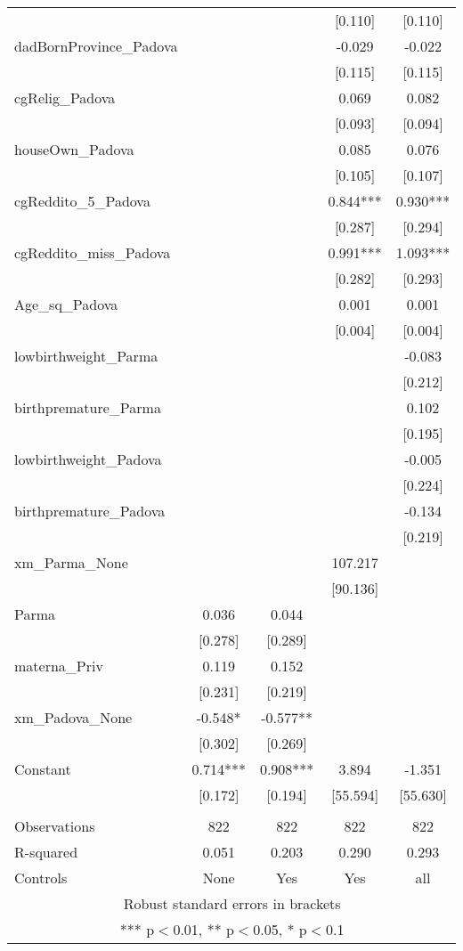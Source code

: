 \documentclass[]{article}
\begin{document}
\begin{tabular}{lcccc}
 &  &  & [0.110] & [0.110] \\
dadBornProvince\_Padova &  &  & -0.029 & -0.022 \\
 &  &  & [0.115] & [0.115] \\
cgRelig\_Padova &  &  & 0.069 & 0.082 \\
 &  &  & [0.093] & [0.094] \\
houseOwn\_Padova &  &  & 0.085 & 0.076 \\
 &  &  & [0.105] & [0.107] \\
cgReddito\_5\_Padova &  &  & 0.844*** & 0.930*** \\
 &  &  & [0.287] & [0.294] \\
cgReddito\_miss\_Padova &  &  & 0.991*** & 1.093*** \\
 &  &  & [0.282] & [0.293] \\
Age\_sq\_Padova &  &  & 0.001 & 0.001 \\
 &  &  & [0.004] & [0.004] \\
lowbirthweight\_Parma &  &  &  & -0.083 \\
 &  &  &  & [0.212] \\
birthpremature\_Parma &  &  &  & 0.102 \\
 &  &  &  & [0.195] \\
lowbirthweight\_Padova &  &  &  & -0.005 \\
 &  &  &  & [0.224] \\
birthpremature\_Padova &  &  &  & -0.134 \\
 &  &  &  & [0.219] \\
xm\_Parma\_None &  &  & 107.217 &  \\
 &  &  & [90.136] &  \\
Parma & 0.036 & 0.044 &  &  \\
 & [0.278] & [0.289] &  &  \\
materna\_Priv & 0.119 & 0.152 &  &  \\
 & [0.231] & [0.219] &  &  \\
xm\_Padova\_None & -0.548* & -0.577** &  &  \\
 & [0.302] & [0.269] &  &  \\
Constant & 0.714*** & 0.908*** & 3.894 & -1.351 \\
 & [0.172] & [0.194] & [55.594] & [55.630] \\
 &  &  &  &  \\
Observations & 822 & 822 & 822 & 822 \\
R-squared & 0.051 & 0.203 & 0.290 & 0.293 \\
 Controls & None & Yes & Yes & all \\ \hline
\multicolumn{5}{c}{ Robust standard errors in brackets} \\
\multicolumn{5}{c}{ *** p$<$0.01, ** p$<$0.05, * p$<$0.1} \\
\end{tabular}
\end{document}
